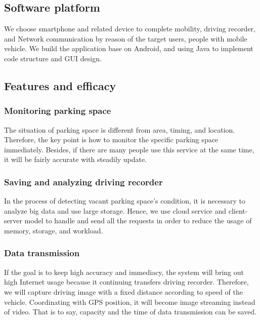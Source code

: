 \documentclass[runningheads,a4paper]{llncs}
\begin{document}
\begin{CJK}{UTF8}{bsmi}
%
\subsection{Software platform}
%

We choose smartphone and related device to complete mobility, driving
recorder, and Network communication by reason of the target users,
people with mobile vehicle. We build the application base on Android,
and using Java to implement code structure and GUI design.

%
\subsection{Features and efficacy}
%

%
\subsubsection{Monitoring parking space}
%

The situation of parking space is different from area, timing, and
location. Therefore, the key point is how to monitor the specific
parking space immediately. Besides, if there are many people use this
service at the same time, it will be fairly accurate with steadily
update.

%
\subsubsection{Saving and analyzing driving recorder}
%

In the process of detecting vacant parking space's condition, it is
necessary to analyze big data and use large storage. Hence, we use cloud
service and client-server model to handle and send all the requests in
order to reduce the usage of memory, storage, and workload.

%
\subsubsection{Data transmission}
%

If the goal is to keep high accuracy and immediacy, the system will
bring out high Internet usage because it continuing transfers driving
recorder. Therefore, we will capture driving image with a fixed distance
according to speed of the vehicle. Coordinating with GPS position, it
will become image streaming instead of video. That is to say, capacity
and the time of data transmission can be saved.


\end{CJK}
\end{document}
